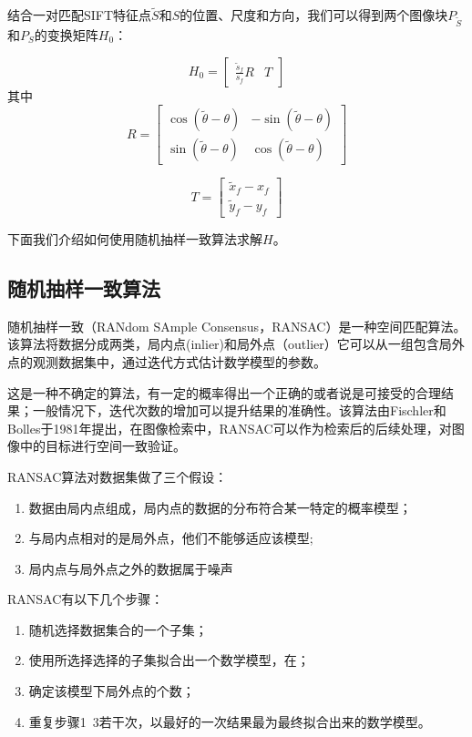 结合一对匹配SIFT特征点\(\tilde{S}\)和\(S\)的位置、尺度和方向，我们可以得到两个图像块\(P_{\tilde{S}}\)和\(P_S\)的变换矩阵\(H_0\)：

\begin{equation}
	H_0 = 
	\begin{bmatrix}
	\frac{\tilde{s}_f}{s_f} R & T
	\end{bmatrix}
\end{equation}
其中
\begin{equation}
	R = 
	\begin{bmatrix}
		\cos{(\tilde{\theta}-\theta)} & -\sin{(\tilde{\theta}-\theta)} \\
		\sin{(\tilde{\theta}-\theta)} & \cos{(\tilde{\theta}-\theta)} 
	\end{bmatrix}
\end{equation}

\begin{equation}
	T = 
	\begin{bmatrix}
		\tilde{x}_f - x_f \\
		\tilde{y}_f - y_f
	\end{bmatrix}
\end{equation}

下面我们介绍如何使用随机抽样一致算法求解\(H\)。

\subsection{随机抽样一致算法}
随机抽样一致（RANdom SAmple Consensus，RANSAC）是一种空间匹配算法。该算法将数据分成两类，局内点(inlier)和局外点（outlier）它可以从一组包含局外点的观测数据集中，通过迭代方式估计数学模型的参数。

这是一种不确定的算法，有一定的概率得出一个正确的或者说是可接受的合理结果；一般情况下，迭代次数的增加可以提升结果的准确性。该算法由Fischler和Bolles于1981年提出，在图像检索中，RANSAC可以作为检索后的后续处理，对图像中的目标进行空间一致验证。

RANSAC算法对数据集做了三个假设：

\begin{enumerate}
\item 数据由局内点组成，局内点的数据的分布符合某一特定的概率模型；
\item 与局内点相对的是局外点，他们不能够适应该模型;
\item 局内点与局外点之外的数据属于噪声
\end{enumerate}

RANSAC有以下几个步骤：
\begin{enumerate}
\item 随机选择数据集合的一个子集；
\item 使用所选择选择的子集拟合出一个数学模型，在；
\item 确定该模型下局外点的个数；
\item 重复步骤1~3若干次，以最好的一次结果最为最终拟合出来的数学模型。
\end{enumerate}

